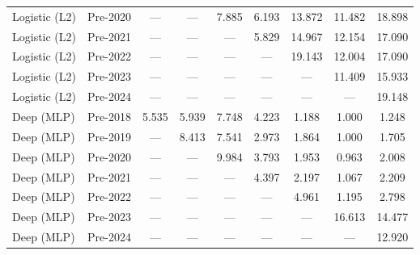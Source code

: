 \begin{table}[htbp]
{\begin{tabular}{l lccccccc}
Logistic (L2) & Pre-2020 & --- & --- & 7.885 & 6.193 & 13.872 & 11.482 & 18.898 \\
Logistic (L2) & Pre-2021 & --- & --- & --- & 5.829 & 14.967 & 12.154 & 17.090 \\
Logistic (L2) & Pre-2022 & --- & --- & --- & --- & 19.143 & 12.004 & 17.090 \\
Logistic (L2) & Pre-2023 & --- & --- & --- & --- & --- & 11.409 & 15.933 \\
Logistic (L2) & Pre-2024 & --- & --- & --- & --- & --- & --- & 19.148 \\
Deep (MLP) & Pre-2018 & 5.535 & 5.939 & 7.748 & 4.223 & 1.188 & 1.000 & 1.248 \\
Deep (MLP) & Pre-2019 & --- & 8.413 & 7.541 & 2.973 & 1.864 & 1.000 & 1.705 \\
Deep (MLP) & Pre-2020 & --- & --- & 9.984 & 3.793 & 1.953 & 0.963 & 2.008 \\
Deep (MLP) & Pre-2021 & --- & --- & --- & 4.397 & 2.197 & 1.067 & 2.209 \\
Deep (MLP) & Pre-2022 & --- & --- & --- & --- & 4.961 & 1.195 & 2.798 \\
Deep (MLP) & Pre-2023 & --- & --- & --- & --- & --- & 16.613 & 14.477 \\
Deep (MLP) & Pre-2024 & --- & --- & --- & --- & --- & --- & 12.920 \\
\bottomrule
\end{tabular}%
}
\end{table}